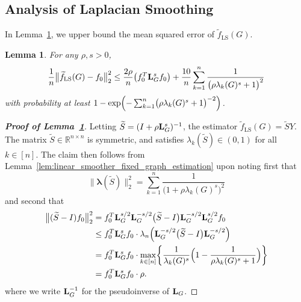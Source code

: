 \documentclass{article}
\newcommand{\Reals}{\mathbb{R}}
\newcommand{\1}{\mathbf{1}}
\newcommand{\lambdavec}{\boldsymbol{\lambda}}
\newcommand{\Lap}{{\bf L}}
\newcommand{\Id}{I}
\newcommand{\wt}[1]{\widetilde{#1}}
\newcommand{\LS}{\mathrm{LS}}
\theoremstyle{alden}
\theoremstyle{aldenthm}
\newtheorem{lemma}{Lemma}
\theoremstyle{definition}
\theoremstyle{remark}
\begin{document}
\subsection{Analysis of Laplacian Smoothing}
In Lemma~\ref{lem:ls_fixed_graph_estimation}, we upper bound the mean squared error of $\wt{f}_{\LS}(G)$.
\begin{lemma}
	\label{lem:ls_fixed_graph_estimation}
	For any $\rho,s > 0$,
	\begin{equation}
	\label{eqn:ls_fixed_graph_estimation_prob}
	\frac{1}{n}\bigl\|\wt{f}_{\LS}(G) - f_0\bigr\|_2^2 \leq \frac{2\rho}{n} \bigl(f_0^T \Lap_{G}^s f_0\bigr) + \frac{10}{n}\sum_{k = 1}^{n} \frac{1}{\bigl(\rho \lambda_{k}(G)^s + 1\bigr)^2}
	\end{equation}
	with probability at least $1 - \exp\Bigl(-\sum_{k = 1}^{n}\bigl(\rho \lambda_k(G)^s + 1\bigr)^{-2}\Bigr)$.
\end{lemma}
\begin{proof}[\textbf{Proof of Lemma~\ref{lem:ls_fixed_graph_estimation}}]
	Letting $\wt{S} = (\Id + \rho \Lap_G^s)^{-1}$, the estimator $\wt{f}_{\LS}(G) = \wt{S}Y$. The matrix $\wt{S} \in \Reals^{n \times n}$ is symmetric, and satisfies $\lambda_k(\wt{S}) \in (0,1)$ for all $k \in [n]$. The claim then follows from Lemma~\ref{lem:linear_smoother_fixed_graph_estimation} upon noting first that
	\begin{equation*}
	\bigl\|\lambdavec(\wt{S})\bigr\|_2^2 = \sum_{k = 1}^{n} \frac{1}{\bigl(1 + \rho \lambda_k(G)^s\bigr)^2}
	\end{equation*} 
	and second that
	\begin{equation*}
	\begin{aligned}
	\bigl\|(\wt{S} - I)f_0\bigr\|_2^2 & = f_0^T \Lap_G^{s/2} \Lap_G^{-s/2}\bigl(\wt{S} - \Id\bigr) \Lap_G^{-s/2} \Lap_G^{s/2} f_0 \\
	& \leq f_0^T \Lap_G^s f_0 \cdot \lambda_n\Bigl(\Lap_G^{-s/2}\bigl(\wt{S} - \Id\bigr)\Lap_G^{-s/2}\Bigr) \\
	& = f_0^T \Lap_G^s f_0 \cdot \max_{k \in [n]} \biggl\{\frac{1}{\lambda_k(G)^s} \Bigl(1 - \frac{1}{\rho\lambda_k(G)^s + 1}\Bigr) \biggr\} \\
	& = f_0^T \Lap_G^s f_0 \cdot \rho.
	\end{aligned}
	\end{equation*} 
	where we write $\Lap_G^{-1}$ for the pseudoinverse of $\Lap_G$.
\end{proof}
\end{document}
